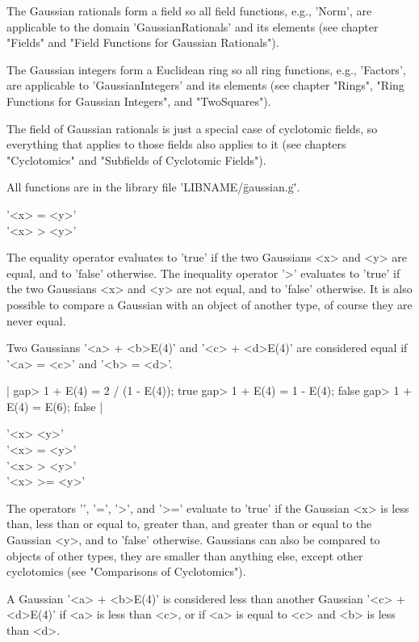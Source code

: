 The Gaussian rationals form a field so all field functions, e.g., 'Norm',
are  applicable to the domain  'GaussianRationals'  and its elements (see
chapter "Fields" and "Field Functions for Gaussian Rationals").

The Gaussian integers  form a Euclidean ring so all ring functions, e.g.,
'Factors', are applicable to  'GaussianIntegers'  and its  elements  (see
chapter   "Rings",   "Ring   Functions  for   Gaussian   Integers",   and
"TwoSquares").

The field of Gaussian  rationals is  just a  special  case of  cyclotomic
fields,  so everything that applies to  those fields also  applies  to it
(see chapters "Cyclotomics" and "Subfields of Cyclotomic Fields").

All functions are in the library file 'LIBNAME/\"gaussian.g\"'.

%
%

'<x> = <y>' \\
'<x> \<> <y>'

The  equality operator evaluates  to 'true' if  the two Gaussians <x> and
<y> are  equal, and to 'false' otherwise.   The inequality operator '\<>'
evaluates to 'true' if the  two Gaussians <x> and <y>  are not equal, and
to 'false' otherwise.  It is also possible  to compare a Gaussian with an
object of another type, of course they are never equal.

Two Gaussians '<a>  +  <b>\*E(4)' and  '<c> + <d>\*E(4)'   are considered
equal if '<a> = <c>' and '<b> = <d>'.

|    gap> 1 + E(4) = 2 / (1 - E(4));
    true
    gap> 1 + E(4) = 1 - E(4);
    false
    gap> 1 + E(4) = E(6);
    false |

'<x> \< <y>' \\
'<x> \<= <y>' \\
'<x> > <y>' \\
'<x> >= <y>'

The operators  '\<',  '\<=', '>',  and  '>='  evaluate to  'true' if  the
Gaussian  <x> is  less  than, less  than or equal   to, greater than, and
greater  than or equal to  the  Gaussian <y>,  and  to 'false' otherwise.
Gaussians can   also be compared  to objects   of other types,  they  are
smaller than anything else, except other cyclotomics (see "Comparisons of
Cyclotomics").

A Gaussian '<a>  +  <b>\*E(4)' is considered  less  than another Gaussian
'<c> + <d>\*E(4)' if <a> is less than <c>, or if <a> is  equal to <c> and
<b> is less than <d>.

